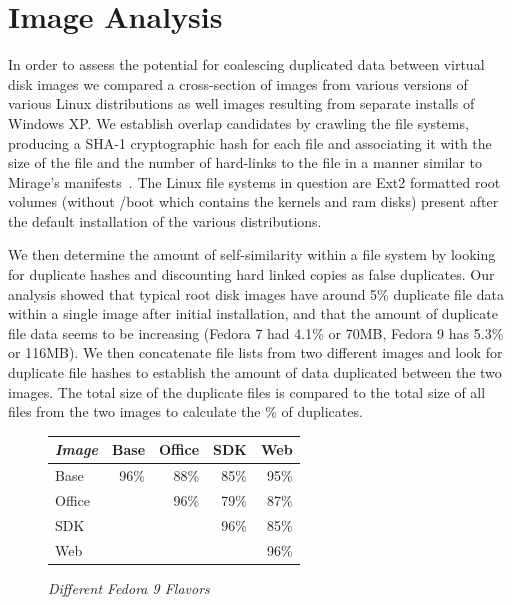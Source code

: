 \section{Image Analysis}

In order to assess the potential for coalescing duplicated data between
virtual disk images we compared a cross-section of images from various 
versions of various Linux distributions as well images resulting from
separate installs of Windows XP.
We establish overlap candidates by crawling the file systems, producing a SHA-1
cryptographic hash for each file and associating it with the size of the 
file and the number of hard-links to the file in a manner similar to
Mirage's manifests~\cite{mirage}.
The Linux file systems in question are Ext2 formatted root volumes
(without /boot which contains the kernels and ram disks) present after the 
default installation of the various distributions.

We then determine the amount of self-similarity within a file system by looking
for duplicate hashes and discounting hard linked copies as false duplicates.
Our analysis showed that typical root disk images have around 5\% 
duplicate file data within a single image after initial installation, 
and that the amount of duplicate file data seems to be increasing 
(Fedora 7 had 4.1\% or 70MB, Fedora 9 has 5.3\% or 116MB).
We then concatenate file lists from two different images and look for
duplicate file hashes to establish the amount of data duplicated between
the two images.  The total size of the duplicate files is compared to the
total size of all files from the two images to calculate the \% of duplicates.

\begin{figure}[htbp]
\begin{centering}
\begin{tabular}{|l|r|r|r|r|}	\hline 
\emph{Image}	& Base	& Office	& SDK	& Web \\ \hline
Base	& 96\%	& 88\%	& 85\%	& 95\% \\
Office	& 	& 96\%	& 79\%	& 87\% \\
SDK	& 	& 	& 96\%	& 85\% \\
Web	& 	& 	& 	& 96\% \\	\hline
\end{tabular}
\small\itshape
\caption{\small\itshape Different Fedora 9 Flavors}
\label{fig:flavors}
\end{centering}
\end{figure}

